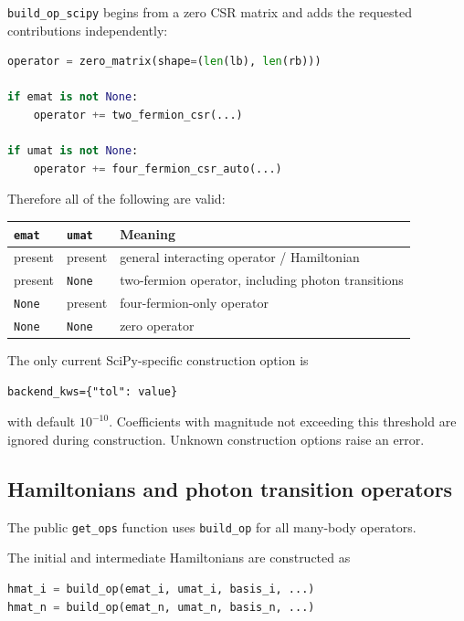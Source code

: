 \documentclass[11pt]{article}
\begin{document}
\texttt{build\_op\_scipy} begins from a zero CSR matrix and adds the requested contributions independently:

\begin{lstlisting}[language=Python]
operator = zero_matrix(shape=(len(lb), len(rb)))

if emat is not None:
    operator += two_fermion_csr(...)

if umat is not None:
    operator += four_fermion_csr_auto(...)
\end{lstlisting}

Therefore all of the following are valid:

\begin{center}
\begin{tabular}{lll}
\toprule
\texttt{emat} & \texttt{umat} & Meaning \\
\midrule
present & present & general interacting operator / Hamiltonian \\
present & \texttt{None} & two-fermion operator, including photon transitions \\
\texttt{None} & present & four-fermion-only operator \\
\texttt{None} & \texttt{None} & zero operator \\
\bottomrule
\end{tabular}
\end{center}

The only current SciPy-specific construction option is

\begin{lstlisting}
backend_kws={"tol": value}
\end{lstlisting}

with default \(10^{-10}\).  Coefficients with magnitude not exceeding this threshold are ignored during construction.  Unknown construction options raise an error.

\subsection{Hamiltonians and photon transition operators}

The public \texttt{get\_ops} function uses \texttt{build\_op} for all many-body operators.

The initial and intermediate Hamiltonians are constructed as

\begin{lstlisting}[language=Python]
hmat_i = build_op(emat_i, umat_i, basis_i, ...)
hmat_n = build_op(emat_n, umat_n, basis_n, ...)
\end{lstlisting}
\end{document}
